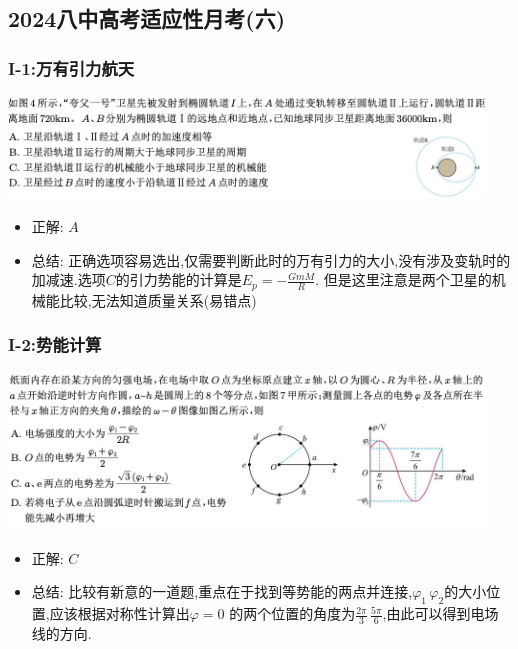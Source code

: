 \documentclass{article}
\begin{document}
\vspace{2em}

\subsection{2024八中高考适应性月考(六)}
\subsubsection{I-1:万有引力航天}

\includegraphics[width=0.95\textwidth,keepaspectratio]{./pictures/3.2-1.png}

\begin{itemize}
    \item 正解: $A$
    \item 总结: 正确选项容易选出,仅需要判断此时的万有引力的大小,没有涉及变轨时的加减速.选项$C$的引力势能的计算是$E_{p} = - \frac{GmM}{R}$.
          但是这里注意是两个卫星的机械能比较,无法知道质量关系(易错点)
\end{itemize}

\vspace{2em}

\subsubsection{I-2:势能计算}
\includegraphics[width=0.95\textwidth,keepaspectratio]{./pictures/3.2-2.png}

\begin{itemize}
    \item 正解: $C$
    \item 总结: 比较有新意的一道题,重点在于找到等势能的两点并连接,$\varphi_{1} \, \varphi_{2}$的大小位置,应该根据对称性计算出$\varphi = 0$
          的两个位置的角度为$\frac{2\pi}{3} \, \frac{5\pi}{6} $,由此可以得到电场线的方向.
\end{itemize}
\end{document}
